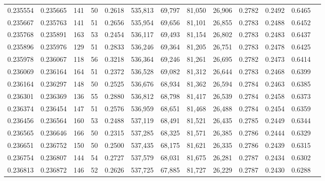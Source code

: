 \begin{tabular}{rrrrrrrrrrrrr}
0.235554 & 0.235665 &   141 &  50 &                                     0.2618 & 535,813 &  69,797 &  81,050 &  26,906 & 0.2782 & 0.2492 & 0.6465 \\
0.235667 & 0.235763 &   141 &  51 &                                     0.2656 & 535,954 &  69,656 &  81,101 &  26,855 & 0.2783 & 0.2488 & 0.6452 \\
0.235768 & 0.235891 &   163 &  53 &                                     0.2454 & 536,117 &  69,493 &  81,154 &  26,802 & 0.2783 & 0.2483 & 0.6437 \\
0.235896 & 0.235976 &   129 &  51 &                                     0.2833 & 536,246 &  69,364 &  81,205 &  26,751 & 0.2783 & 0.2478 & 0.6425 \\
0.235978 & 0.236067 &   118 &  56 &                                     0.3218 & 536,364 &  69,246 &  81,261 &  26,695 & 0.2782 & 0.2473 & 0.6414 \\
0.236069 & 0.236164 &   164 &  51 &                                     0.2372 & 536,528 &  69,082 &  81,312 &  26,644 & 0.2783 & 0.2468 & 0.6399 \\
0.236164 & 0.236297 &   148 &  50 &                                     0.2525 & 536,676 &  68,934 &  81,362 &  26,594 & 0.2784 & 0.2463 & 0.6385 \\
0.236301 & 0.236369 &   136 &  55 &                                     0.2880 & 536,812 &  68,798 &  81,417 &  26,539 & 0.2784 & 0.2458 & 0.6373 \\
0.236374 & 0.236454 &   147 &  51 &                                     0.2576 & 536,959 &  68,651 &  81,468 &  26,488 & 0.2784 & 0.2454 & 0.6359 \\
0.236456 & 0.236564 &   160 &  53 &                                     0.2488 & 537,119 &  68,491 &  81,521 &  26,435 & 0.2785 & 0.2449 & 0.6344 \\
0.236565 & 0.236646 &   166 &  50 &                                     0.2315 & 537,285 &  68,325 &  81,571 &  26,385 & 0.2786 & 0.2444 & 0.6329 \\
0.236651 & 0.236752 &   150 &  50 &                                     0.2500 & 537,435 &  68,175 &  81,621 &  26,335 & 0.2786 & 0.2439 & 0.6315 \\
0.236754 & 0.236807 &   144 &  54 &                                     0.2727 & 537,579 &  68,031 &  81,675 &  26,281 & 0.2787 & 0.2434 & 0.6302 \\
0.236813 & 0.236872 &   146 &  52 &                                     0.2626 & 537,725 &  67,885 &  81,727 &  26,229 & 0.2787 & 0.2430 & 0.6288 \\

\end{tabular}
